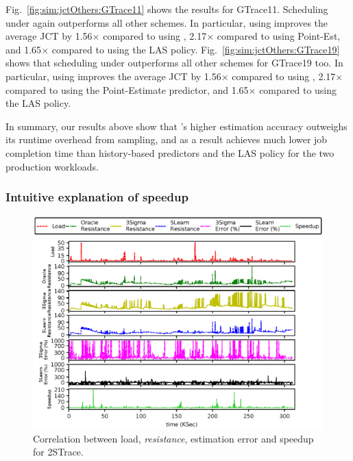 Fig.~\ref{fig:sim:jctOthers:GTrace11} shows the results for GTrace11.  
Scheduling under \slearn again outperforms all other schemes. In particular,
using \slearn improves the average JCT by 1.56$\times$ compared to using
\primarybasepredict, 2.17$\times$ compared to using Point-Est,
and 1.65$\times$ compared to using the LAS policy.
Fig.~\ref{fig:sim:jctOthers:GTrace19} shows that
scheduling under \slearn outperforms all other schemes for GTrace19 too.
In particular, using \slearn improves
the average JCT by 1.56$\times$ compared to using \primarybasepredict,
2.17$\times$ compared to using the Point-Estimate predictor, and 1.65$\times$
compared to using the LAS policy.

In summary, our results above show that \slearn's higher estimation accuracy
outweighs its runtime overhead from sampling, and as a result achieves much
lower job completion time than history-based predictors and the LAS policy for
the two production workloads.


\subsubsection{Intuitive explanation of speedup}
\label{sec:sim:intuitionSpeedup}

\begin{figure}
	\includegraphics[width=1.0\linewidth]{figures/simulation/2STrace-Trial.eps}
	\caption{Correlation between load, \textit{resistance}, estimation error and speedup for 2STrace. }
	\label{figs:sim:intuitionSpeedup:allInOne}
\end{figure}

